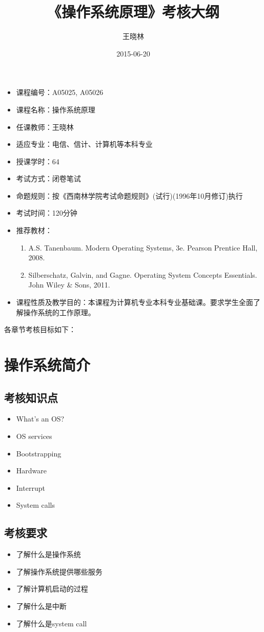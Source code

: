 \documentclass[11pt]{article}
\author{王晓林}
\date{2015-06-20}
\title{《操作系统原理》考核大纲}
\begin{document}
\maketitle
\tableofcontents
\clearpage

\begin{itemize}
\item 课程编号：A05025, A05026
\item 课程名称：操作系统原理
\item 任课教师：王晓林
\item 适应专业：电信、信计、计算机等本科专业
\item 授课学时：64
\item 考试方式：闭卷笔试
\item 命题规则：按《西南林学院考试命题规则》(试行)(1996年10月修订)执行
\item 考试时间：120分钟
\item 推荐教材：
\begin{enumerate}
\item A.S. Tanenbaum. Modern Operating Systems, 3e. Pearson Prentice Hall, 2008.
\item Silberschatz, Galvin, and Gagne. Operating System Concepts Essentials. John Wiley \& Sons, 2011.
\end{enumerate}
\item 课程性质及教学目的：本课程为计算机专业本科专业基础课。要求学生全面了解操作系统的工作原理。
\end{itemize}

各章节考核目标如下：
\section{操作系统简介}
\label{sec-1}
\subsection{考核知识点}
\label{sec-1-1}
\begin{itemize}
\item What's an OS?
\item OS services
\item Bootstrapping
\item Hardware
\item Interrupt
\item System calls
\end{itemize}
\subsection{考核要求}
\label{sec-1-2}
\begin{itemize}
\item 了解什么是操作系统
\item 了解操作系统提供哪些服务
\item 了解计算机启动的过程
\item 了解什么是中断
\item 了解什么是system call
\end{itemize}
\end{document}
